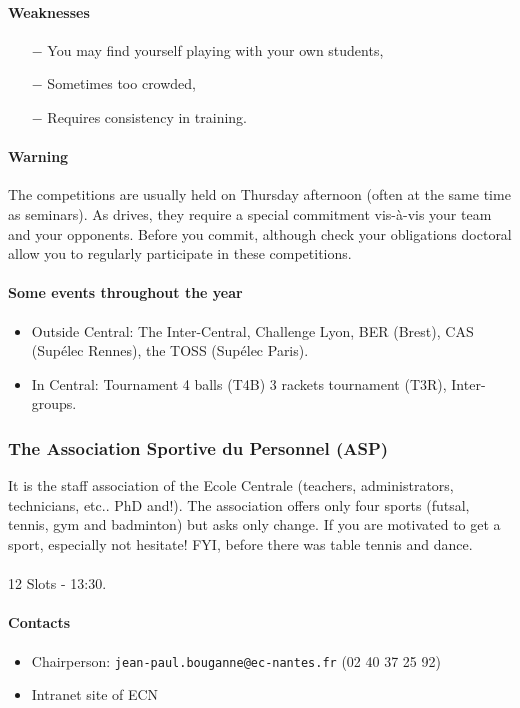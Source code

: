\paragraph{Weaknesses}
\begin{itemize}
  \item [$-$] You may find yourself playing with your own students,
  \item [$-$] Sometimes too crowded,
  \item [$-$] Requires consistency in training.
\end{itemize}

\paragraph{Warning} The competitions are usually held on Thursday afternoon (often at the same time as seminars).
As drives, they require a special commitment vis-à-vis your team and your opponents.
Before you commit, although check your obligations doctoral allow you to regularly participate in these competitions.

\paragraph{Some events throughout the year}
\begin{itemize}
  \item Outside Central: The Inter-Central, Challenge Lyon, BER (Brest), CAS (Supélec Rennes), the TOSS (Supélec Paris).
  \item In Central: Tournament 4 balls (T4B) 3 rackets tournament (T3R), Inter-groups.
\end{itemize}

\subsubsection {The Association Sportive du Personnel (ASP)}
It is the staff association of the Ecole Centrale (teachers, administrators, technicians, etc.. PhD and!). The association offers only four sports (futsal, tennis, gym and badminton) but asks only change. If you are motivated to get a sport, especially not hesitate! FYI, before there was table tennis and dance.

\paragraph{} 12 Slots - 13:30.
\paragraph{Contacts}
\begin {itemize}
  \item Chairperson: \texttt{jean-paul.bouganne@ec-nantes.fr} (02 40 37 25 92)
  \item Intranet site of ECN
\end {itemize}
